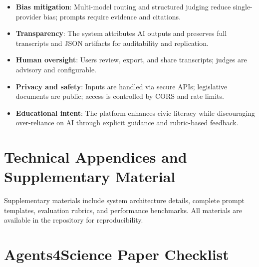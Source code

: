\documentclass{article}
\begin{document}
\begin{itemize}
    \item \textbf{Bias mitigation}: Multi-model routing and structured judging reduce single-provider bias; prompts require evidence and citations.
    \item \textbf{Transparency}: The system attributes AI outputs and preserves full transcripts and JSON artifacts for auditability and replication.
    \item \textbf{Human oversight}: Users review, export, and share transcripts; judges are advisory and configurable.
    \item \textbf{Privacy and safety}: Inputs are handled via secure APIs; legislative documents are public; access is controlled by CORS and rate limits.
    \item \textbf{Educational intent}: The platform enhances civic literacy while discouraging over-reliance on AI through explicit guidance and rubric-based feedback.
\end{itemize}

\newpage



\appendix
\section{Technical Appendices and Supplementary Material}

Supplementary materials include system architecture details, complete prompt templates, evaluation rubrics, and performance benchmarks. All materials are available in the repository for reproducibility.


\newpage

\section*{Agents4Science Paper Checklist}
\end{document}
